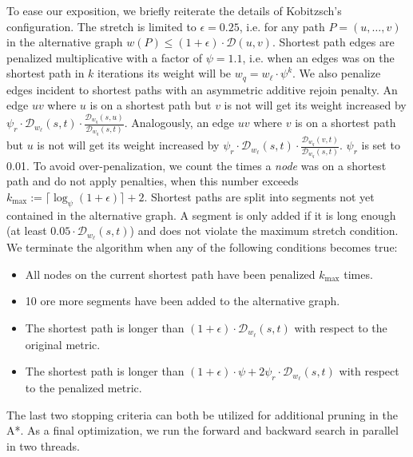\documentclass[manuscript,review]{acmart}
\newcommand*{\dist}{\mathcal{D}}
\begin{document}
To ease our exposition, we briefly reiterate the details of Kobitzsch's configuration.
The stretch is limited to $\epsilon = 0.25$, i.e. for any path $P = (u,\dots,v)$ in the alternative graph $w(P) \leq (1+\epsilon) \cdot \dist(u,v)$.
Shortest path edges are penalized multiplicative with a factor of $\psi = 1.1$, i.e. when an edges was on the shortest path in $k$ iterations its weight will be $w_q = w_{\ell}\cdot\psi^k$.
We also penalize edges incident to shortest paths with an asymmetric additive rejoin penalty.
An edge $uv$ where $u$ is on a shortest path but $v$ is not will get its weight increased by $\psi_r \cdot \dist_{w_{\ell}}(s,t) \cdot \frac{\dist_{w_q}(s,u)}{\dist_{w_q}(s,t)}$.
Analogously, an edge $uv$ where $v$ is on a shortest path but $u$ is not will get its weight increased by $\psi_r \cdot \dist_{w_{\ell}}(s,t) \cdot \frac{\dist_{w_q}(v,t)}{\dist_{w_q}(s,t)}$.
$\psi_r$ is set to 0.01.
To avoid over-penalization, we count the times a \emph{node} was on a shortest path and do not apply penalties, when this number exceeds $k_{\max} := \lceil\log_{\psi}(1+\epsilon)\rceil + 2$.
Shortest paths are split into segments not yet contained in the alternative graph.
A segment is only added if it is long enough (at least $0.05 \cdot \dist_{w_{\ell}}(s,t)$) and does not violate the maximum stretch condition.
We terminate the algorithm when any of the following conditions becomes true:
\begin{itemize}
	\item All nodes on the current shortest path have been penalized $k_{\max}$ times.
	\item 10 ore more segments have been added to the alternative graph.
	\item The shortest path is longer than $(1+\epsilon) \cdot \dist_{w_{\ell}}(s,t)$ with respect to the original metric.
	\item The shortest path is longer than $(1+\epsilon) \cdot \psi + 2\psi_r \cdot \dist_{w_{\ell}}(s,t)$ with respect to the penalized metric.
\end{itemize}
The last two stopping criteria can both be utilized for additional pruning in the A*.
As a final optimization, we run the forward and backward search in parallel in two threads.
\end{document}
